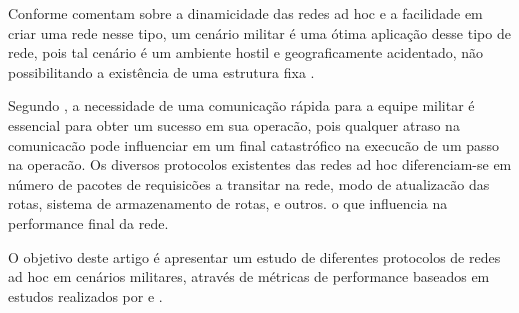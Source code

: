 Conforme \cite{pepe} comentam sobre a dinamicidade das redes ad hoc e a facilidade em criar uma rede nesse tipo, um cen\'ario militar \'e uma \'otima aplica\c{c}\~ao desse tipo de rede, pois tal cen\'ario \'e um ambiente hostil e geograficamente acidentado, n\~ao possibilitando a exist\^encia de uma estrutura fixa \cite{schimidt}.

Segundo \cite{salles}, a necessidade de uma comunica\c{c}\~ao r\'apida para a equipe militar \'e essencial para obter um sucesso em sua operac\~ao, pois qualquer atraso na comunicac\~ao pode influenciar em um final catastr\'ofico na execuc\~ao de um passo na operac\~ao. Os diversos protocolos existentes das redes ad hoc diferenciam-se em n\'umero de pacotes de requisic\~oes a transitar na rede, modo de atualizac\~ao das rotas, sistema de armazenamento de rotas, e outros. o que influencia na performance final da rede.

O objetivo deste artigo \'e apresentar um estudo de diferentes protocolos de redes ad hoc em cen\'arios militares, atrav\'es de m\'etricas de performance baseados em estudos realizados por \cite{pereira} e \cite{salles}.

